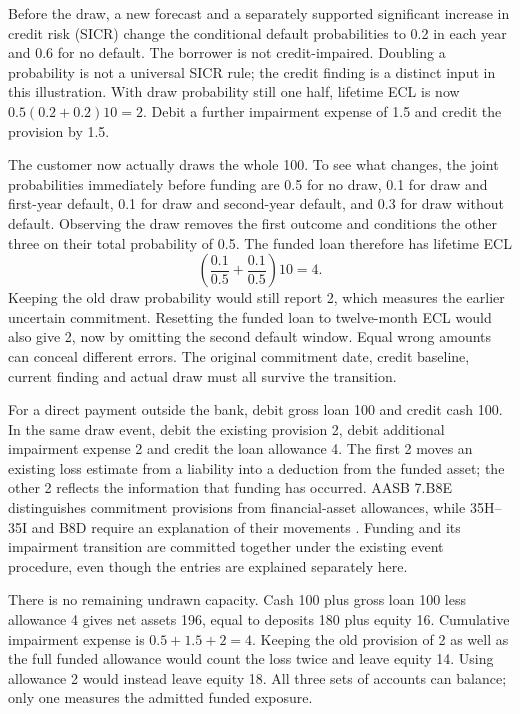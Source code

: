 Before the draw, a new forecast and a separately supported significant
increase in credit risk (SICR) change the conditional default probabilities
to 0.2 in each year and 0.6 for no default. The borrower is not credit-impaired.
Doubling a probability is not a universal SICR rule; the credit finding is
a distinct input in this illustration. With draw probability still one half,
lifetime ECL is now \(0.5(0.2+0.2)10=2\). Debit a further impairment
expense of 1.5 and credit the provision by 1.5.

The customer now actually draws the whole 100. To see what changes, the
joint probabilities immediately before funding are 0.5 for no draw, 0.1
for draw and first-year default, 0.1 for draw and second-year default, and
0.3 for draw without default. Observing the draw removes the first outcome
and conditions the other three on their total probability of 0.5. The
funded loan therefore has lifetime ECL
\[
  \left(\frac{0.1}{0.5}+\frac{0.1}{0.5}\right)10=4.
\]
Keeping the old draw probability would still report 2, which measures the
earlier uncertain commitment. Resetting the funded loan to twelve-month ECL
would also give 2, now by omitting the second default window. Equal wrong
amounts can conceal different errors. The original commitment date, credit
baseline, current finding and actual draw must all survive the transition.

For a direct payment outside the bank, debit gross loan 100 and credit cash
100. In the same draw event, debit the existing provision 2, debit additional
impairment expense 2 and credit the loan allowance 4. The first 2 moves an
existing loss estimate from a liability into a deduction from the funded
asset; the other 2 reflects the information that funding has occurred.
AASB 7.B8E distinguishes commitment provisions from financial-asset allowances,
while 35H--35I and B8D require an explanation of their movements
\citep{aasb7dated}. Funding and its impairment transition are committed
together under the existing event procedure, even though the entries are
explained separately here.

There is no remaining undrawn capacity. Cash 100 plus gross loan 100 less
allowance 4 gives net assets 196, equal to deposits 180 plus equity 16.
Cumulative impairment expense is \(0.5+1.5+2=4\). Keeping the old provision
of 2 as well as the full funded allowance would count the loss twice and
leave equity 14. Using allowance 2 would instead leave equity 18. All three
sets of accounts can balance; only one measures the admitted funded exposure.

